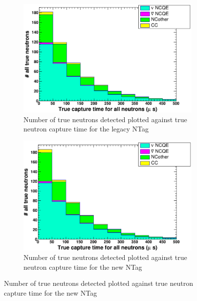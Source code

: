 \begin{figure}
    \centering
     \begin{subfigure}[b]{0.49\linewidth}
      \includegraphics[width=\linewidth]{Figures/TrueCapTimeReductionLegacy.PNG}
      \caption{Number of true neutrons detected plotted against true neutron capture time for the legacy NTag}
      \label{fig:TruCapTimeReductionLegacy} 
     \end{subfigure}
     \begin{subfigure}[b]{0.49\linewidth}
       \includegraphics[width=\linewidth]{Figures/TrueCapTimeReductionNew.PNG}
        \caption{Number of true neutrons detected plotted against true neutron capture time for the new NTag } 
     \label{fig:TruCapTimeReductionNew}
      \end{subfigure} 
\end{figure}


